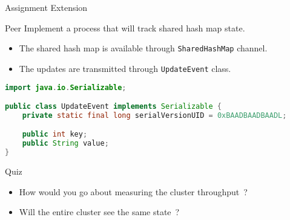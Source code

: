 \begin{frame}[fragile]{Assignment Extension}
    \begin{block}{Peer}
        Implement a process that will track shared hash map state.
        \begin{itemize}
            \item The shared hash map is available through \lstinline{SharedHashMap} channel.
            \item The updates are transmitted through \lstinline{UpdateEvent} class.
        \end{itemize}
    \end{block}

\begin{lstlisting}[language=java,style=mini]
import java.io.Serializable;

public class UpdateEvent implements Serializable {
    private static final long serialVersionUID = 0xBAADBAADBAADL;

    public int key;
    public String value;
}
\end{lstlisting}

    \begin{block}{Quiz}
        \begin{itemize}
            \item How would you go about measuring the cluster throughput~?
            \item Will the entire cluster see the same state~?
        \end{itemize}
    \end{block}
\end{frame}
